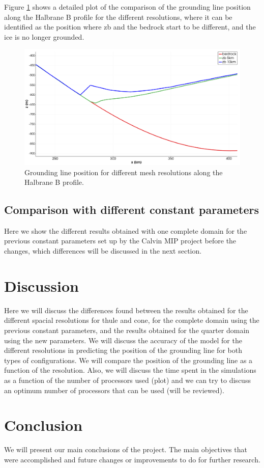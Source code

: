 \documentclass{article}
\begin{document}
Figure \ref{Grounding_line_HalbraneB} shows a detailed plot of the comparison of the grounding line position along the Halbrane B profile for the different resolutions, where it can be identified as the position where zb and the bedrock start to be different, and the ice is no longer grounded. 

	\begin{figure}[!h]
		\centering
		\includegraphics[width=0.9\linewidth]{../fig/zb_10km_5km_HalbraneB_Thule.png}
		\caption{Grounding line position for different mesh resolutions along the Halbrane B profile.}
		\label{Grounding_line_HalbraneB}
	\end{figure}


\subsection{Comparison with different constant parameters}
Here we show the different results obtained with one complete domain for the previous constant parameters set up by the Calvin MIP project before the changes, which differences will be discussed in the next section. 
\section{Discussion}
Here we will discuss the differences found between the results obtained for the different spacial resolutions for thule and cone, for the complete domain using the previous constant parameters, and the results obtained for the quarter domain using the new parameters. We will discuss the accuracy of the model for the different resolutions in predicting the position of the grounding line for both types of configurations. We will compare the position of the grounding line as a function of the resolution. 
Also, we will discuss the time spent in the simulations as a function of the number of processors used (plot) and we can try to discuss an optimum number of processors that can be used (will be reviewed).
\section{Conclusion}
We will present our main conclusions of the project. The main objectives that were accomplished and future changes or improvements to do for further research.
   \pagebreak

    
    
\end{document}
